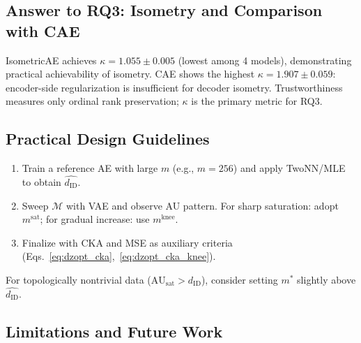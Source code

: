 \documentclass[12pt,a4paper]{article}
\newcommand{\dID}{d_{\mathrm{ID}}}
\newcommand{\kap}{\kappa}
\newcommand{\AUsat}{\mathrm{AU}_{\mathrm{sat}}}
\begin{document}
\subsection{Answer to RQ3: Isometry and Comparison with CAE}\label{sec:disc_rq3}

IsometricAE achieves $\kap = 1.055\pm0.005$ (lowest among 4 models), demonstrating practical achievability of isometry.
CAE shows the highest $\kap = 1.907\pm0.059$: encoder-side regularization is insufficient for decoder isometry.
Trustworthiness measures only ordinal rank preservation; $\kap$ is the primary metric for RQ3.

\subsection{Practical Design Guidelines}\label{sec:disc_guideline}

\begin{enumerate}
  \item Train a reference AE with large $m$ (e.g., $m=256$) and apply TwoNN/MLE to obtain $\hat{\dID}$.
  \item Sweep $\mathcal{M}$ with VAE and observe AU pattern. For sharp saturation: adopt $m^\mathrm{sat}$; for gradual increase: use $m^\mathrm{knee}$.
  \item Finalize with CKA and MSE as auxiliary criteria (Eqs.~\eqref{eq:dzopt_cka},~\eqref{eq:dzopt_cka_knee}).
\end{enumerate}

For topologically nontrivial data ($\AUsat > \dID$), consider setting $m^*$ slightly above $\hat{\dID}$.

\subsection{Limitations and Future Work}\label{sec:disc_limitation}
\end{document}
